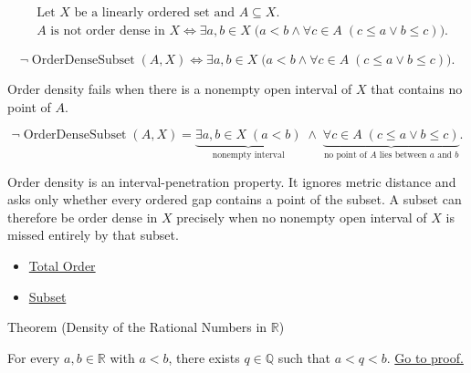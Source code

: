 \begin{remark*}
\[
\begin{aligned}
&\text{Let }X\text{ be a linearly ordered set and }A\subseteq X.\\
&A\text{ is not order dense in }X
\Longleftrightarrow
\exists a,b\in X\;\bigl(a<b\land \forall c\in A\;(c\le a\lor b\le c)\bigr).
\end{aligned}
\]
\end{remark*}

\begin{remark*}
\[
\neg\operatorname{OrderDenseSubset}(A,X)\Longleftrightarrow
\exists a,b\in X\;\bigl(a<b\land \forall c\in A\;(c\le a\lor b\le c)\bigr).
\]
\end{remark*}

\begin{remark*}
Order density fails when there is a nonempty open interval of $X$ that contains no point of $A$.
\end{remark*}

\begin{remark*}
\[
\neg\operatorname{OrderDenseSubset}(A,X)
=
\underbrace{\exists a,b\in X\;(a<b)}_{\text{nonempty interval}}
\;\land\;
\underbrace{\forall c\in A\;(c\le a\lor b\le c)}_{\text{no point of }A\text{ lies between }a\text{ and }b}.
\]
\end{remark*}

\begin{remark*}[Interpretation]
Order density is an interval-penetration property. It ignores metric distance and asks only whether every ordered gap contains a point of the subset. A subset can therefore be order dense in $X$ precisely when no nonempty open interval of $X$ is missed entirely by that subset.
\end{remark*}

\begin{dependencies}
\begin{itemize}
  \item \hyperref[def:total-order]{Total Order}
  \item \hyperref[def:subset]{Subset}
\end{itemize}
\end{dependencies}
\begin{theorembox}{Theorem (Density of the Rational Numbers in $\mathbb{R}$)}
\begin{theorem}
\label{thm:density-of-rationals-in-reals}
For every $a,b\in\mathbb{R}$ with $a<b$, there exists $q\in\mathbb{Q}$ such that $a<q<b$.
\hyperref[prf:density-of-rationals-in-reals]{Go to proof.}
\end{theorem}
\end{theorembox}

